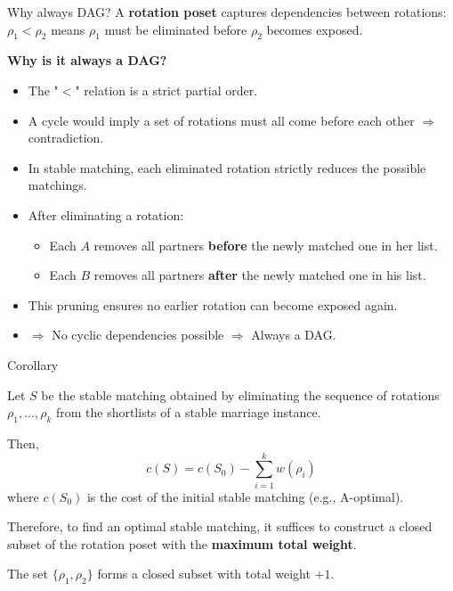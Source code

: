 \documentclass[aspectratio=169,xcolor=dvipsnames]{beamer}
\begin{document}
\begin{frame}{Why always DAG?}
A \textbf{rotation poset} captures dependencies between rotations:  
$\rho_1 < \rho_2$ means $\rho_1$ must be eliminated before $\rho_2$ becomes exposed.
\pause
\medskip

\textbf{Why is it always a DAG?}
\begin{itemize}
    \item The "$<$" relation is a strict partial order.\pause
    \item A cycle would imply a set of rotations must all come before each other $\Rightarrow$ contradiction.\pause
    \item In stable matching, each eliminated rotation strictly reduces the possible matchings.\pause
    \item After eliminating a rotation:
    \begin{itemize}
        \item Each $A$ removes all partners \textbf{before} the newly matched one in her list.
        \item Each $B$ removes all partners \textbf{after} the newly matched one in his list.
    \end{itemize}\pause
    \item This pruning ensures no earlier rotation can become exposed again.\pause
    \item $\Rightarrow$ No cyclic dependencies possible $\Rightarrow$ Always a DAG.
\end{itemize}
\end{frame}





\begin{frame}{Corollary}

    Let \( S \) be the stable matching obtained by eliminating the sequence of rotations \( \rho_1, \ldots, \rho_k \) from the shortlists of a stable marriage instance.

    \pause
    Then,
    \[
        c(S) = c(S_0) - \sum_{i=1}^{k} w(\rho_i)
    \]
    where \( c(S_0) \) is the cost of the initial stable matching (e.g., A-optimal).

    \pause
    Therefore, to find an optimal stable matching, it suffices to construct a closed subset of the rotation poset with the \textbf{maximum total weight}.

    \pause
    \begin{example}
        The set \( \{\rho_1, \rho_2\} \) forms a closed subset with total weight \( +1 \).
    \end{example}

\end{frame}
\end{document}
